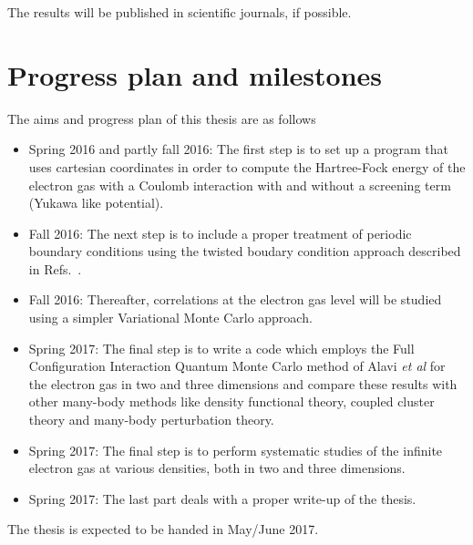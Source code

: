 \documentclass[aps,prc,twocolumn,showpacs,floatfix,nofootinbib,preprintnumbers,superscriptaddress,amsmath,amssymb]{revtex4-1}
\begin{document}
The results will be published in scientific journals, if possible.

\section*{Progress plan and milestones}
The aims and progress plan of this thesis are as follows
\begin{itemize}
\item Spring 2016 and partly fall 2016:  The first step is to set up a program that uses cartesian coordinates in order to compute the Hartree-Fock 
energy of the electron gas with a Coulomb interaction with and without a screening term (Yukawa like potential). 
\item Fall 2016:  The next step is to include a proper treatment of periodic boundary conditions using the twisted boudary condition
approach described in Refs.~\cite{gros1992,gros1996,lin2001}.
\item Fall 2016: Thereafter, correlations at the electron gas level
  will be studied using a simpler Variational Monte Carlo approach.
\item Spring 2017: The final step is to write a code which employs the Full Configuration Interaction Quantum Monte Carlo method of Alavi {\em et al} for the electron gas in two and three dimensions and compare these results with other many-body methods like density functional theory, coupled cluster theory and many-body perturbation theory.
\item Spring 2017: The final step is to perform systematic studies of the infinite electron gas at various densities, both in two and three dimensions.
\item Spring 2017: The last part deals with a proper write-up of the thesis. 
\end{itemize}
 
The thesis is expected to be handed in May/June 2017.
\end{document}
